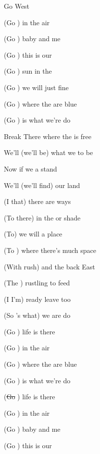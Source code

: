 \begin{SBSong}{Go West}
\begin{SBChorus}
    (Go ) in the  air
    
    (Go ) baby  and me

    (Go ) this is our 

    (Go ) sun in the 

    (Go ) we will  just fine

    (Go ) where the  are blue

    (Go ) is what we're  do
  \end{SBChorus}
  \WBPageBrk
  \begin{SBBracket}{Break}
     There where the  is free
    
    We'll  (we'll be)  what we  to be

     Now if we  a stand

    We'll  (we'll find) our  land
  \end{SBBracket}
  \begin{SBVerse}
    (I  that) there are  ways

    (To  there) in the  or shade

    (To) we will  a place

    (To ) where there's  much space

    (With rush) and the  back East

    (The ) rustling  to feed
 
    (I  I'm) ready  leave too

    (So 's what) we are  do
  \end{SBVerse}
  
  \begin{SBChorus}
    (Go ) life is  there

    (Go ) in the  air
    
    (Go ) where the  are blue

    (Go ) is what we're  do
    
    (\sout{Go }) life is  there

    (Go ) in the  air

    (Go ) baby  and me

    (Go ) this is our 
  \end{SBChorus}
\end{SBSong}
